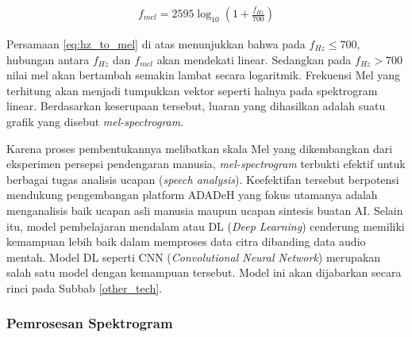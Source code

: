 \begin{align}
  f_{mel} = 2595 \log_{10}\left(1 + \frac{f_{Hz}}{700}\right)
  \label{eq:hz_to_mel}
\end{align}

Persamaan \ref{eq:hz_to_mel} di atas menunjukkan bahwa pada ${f_{Hz} \le 700}$, hubungan antara ${f_{Hz}}$ dan ${f_{mel}}$ akan mendekati linear. Sedangkan pada ${f_{Hz} > 700}$ nilai mel akan bertambah semakin lambat secara logaritmik. Frekuensi Mel yang terhitung akan menjadi tumpukkan vektor seperti halnya pada spektrogram linear. Berdasarkan keserupaan tersebut, luaran yang dihasilkan adalah suatu grafik yang disebut \textit{mel-spectrogram}. 

Karena proses pembentukannya melibatkan skala Mel yang dikembangkan dari eksperimen persepsi pendengaran manusia, \textit{mel-spectrogram} terbukti efektif untuk berbagai tugas analisis ucapan (\textit{speech analysis}). Keefektifan tersebut berpotensi mendukung pengembangan platform ADADeH yang fokus utamanya adalah menganalisis baik ucapan asli manusia maupun ucapan sintesis buatan AI. Selain itu, model pembelajaran mendalam atau DL (\textit{Deep Learning}) cenderung memiliki kemampuan lebih baik dalam memproses data citra dibanding data audio mentah. Model DL seperti CNN (\textit{Convolutional Neural Network}) merupakan salah satu model dengan kemampuan tersebut. Model ini akan dijabarkan secara rinci pada Subbab \ref{other_tech}.

\subsubsection{Pemrosesan Spektrogram}
\label{proc_spektrogram}

